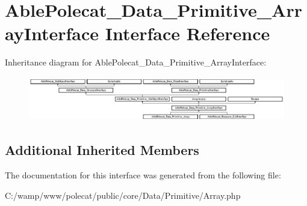 \hypertarget{interface_able_polecat___data___primitive___array_interface}{}\section{Able\+Polecat\+\_\+\+Data\+\_\+\+Primitive\+\_\+\+Array\+Interface Interface Reference}
\label{interface_able_polecat___data___primitive___array_interface}
Inheritance diagram for Able\+Polecat\+\_\+\+Data\+\_\+\+Primitive\+\_\+\+Array\+Interface\+:\begin{figure}[H]
\begin{center}
\leavevmode
\includegraphics[height=1.944444cm]{interface_able_polecat___data___primitive___array_interface}
\end{center}
\end{figure}
\subsection*{Additional Inherited Members}


The documentation for this interface was generated from the following file\+:\begin{DoxyCompactItemize}
\item 
C\+:/wamp/www/polecat/public/core/\+Data/\+Primitive/Array.\+php\end{DoxyCompactItemize}
